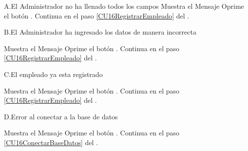 
		
		
		\begin{UCtrayectoriaA}{A.}{El Administrador no ha llenado todos los campos}
			\UCpaso Muestra el Mensaje 
			\UCpaso[\UCactor] Oprime el botón .
			\UCpaso Continua en el paso \ref{CU16RegistrarEmpleado} del .
			
		\end{UCtrayectoriaA}


		\begin{UCtrayectoriaA}{B.}{El Administrador ha ingresado los datos de manera incorrecta}

			\UCpaso Muestra el Mensaje 
			\UCpaso[\UCactor] Oprime el botón .
			\UCpaso Continua en el paso \ref{CU16RegistrarEmpleado} del .

		\end{UCtrayectoriaA}

		\begin{UCtrayectoriaA}{C.}{El empleado ya esta registrado}

			\UCpaso Muestra el Mensaje 
			\UCpaso[\UCactor] Oprime el botón .
			\UCpaso Continua en el paso \ref{CU16RegistrarEmpleado} del .

		\end{UCtrayectoriaA}

		\begin{UCtrayectoriaA}{D.}{Error al conectar a la base de datos}

			\UCpaso Muestra el Mensaje 
			\UCpaso[\UCactor] Oprime el botón .
			\UCpaso Continua en el paso \ref{CU16ConectarBaseDatos} del .

		\end{UCtrayectoriaA}		

